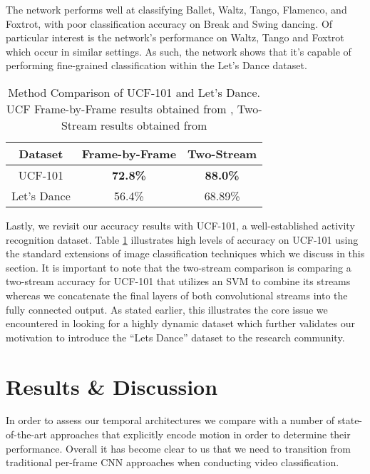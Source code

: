 \documentclass[10pt,twocolumn,letterpaper]{article}
\begin{document}
The network performs well at classifying Ballet, Waltz, Tango, Flamenco, and Foxtrot, with poor classification accuracy on Break and Swing dancing. Of particular interest is the network's performance on Waltz, Tango and Foxtrot which occur in similar settings. As such, the network shows that it's capable of performing fine-grained classification within the Let's Dance dataset.

\begin{table}[htp!]
\begin{center}
\begin{tabular}{|c|c|c|}
\hline
\textbf{Dataset} & \textbf{Frame-by-Frame} & \textbf{Two-Stream } \\ \hline
UCF-101 \cite{soomro2012ucf101} & \textbf{72.8\%} & \textbf{88.0\%} \\ \hline
Let's Dance & 56.4\% & 68.89\% \\ \hline
\end{tabular}
\vspace{0.5em}
\caption{\label{tabucf101} Method Comparison of UCF-101 and Let's Dance. UCF Frame-by-Frame results obtained from \cite{wang2015towards}, Two-Stream results obtained from \cite{NIPS2014_5353}}
\end{center}
\end{table}

Lastly, we revisit our accuracy results with UCF-101, a well-established activity recognition dataset. Table \ref{tabucf101} illustrates high levels of accuracy on UCF-101 using the standard extensions of image classification techniques which we discuss in this section.  It is important to note that the two-stream comparison is comparing a two-stream accuracy for UCF-101 that utilizes an SVM to combine its streams whereas we concatenate the final layers of both convolutional streams into the fully connected output. As stated earlier, this illustrates the core issue we encountered in looking for a highly dynamic dataset which further validates our motivation to introduce the ``Lets Dance'' dataset to the research community.

\section{Results \& Discussion}
\label{results}

In order to assess our temporal architectures we compare with a number of state-of-the-art approaches that explicitly encode motion in order to determine their performance. Overall it has become clear to us that we need to transition from traditional per-frame CNN approaches when conducting video classification. 
\end{document}

